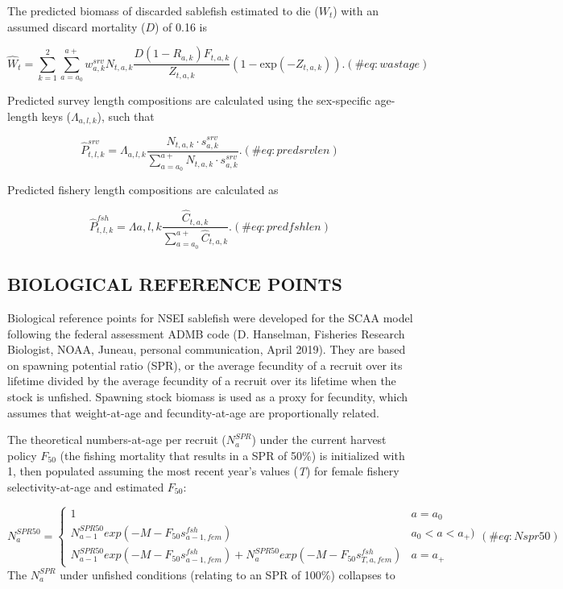 \documentclass[
]{article}
\begin{document}
The predicted biomass of discarded sablefish estimated to die (\(W_t\))
with an assumed discard mortality (\(D\)) of 0.16 is

\[
\begin{equation}
\hat{W}_t= \sum_{k=1}^{2}\sum_{a=a_0}^{a+}w_{a,k}^{srv}N_{t,a,k}\frac{D (1-R_{a,k})F_{t,a,k}}{Z_{t,a,k}}(1-\mbox{exp}(-Z_{t,a,k})).
(\#eq:wastage)
\end{equation}
\]

Predicted survey length compositions are calculated using the
sex-specific age-length keys (\(\Lambda_{a,l,k}\)), such that

\[
\begin{equation}
\hat{P}_{t,l,k}^{srv}=\Lambda_{a,l,k}\frac{N_{t,a,k} \cdot s_{a,k}^{srv}}{\sum_{a=a_0}^{a+} N_{t,a,k} \cdot s_{a,k}^{srv}}.
(\#eq:predsrvlen)
\end{equation}
\]

Predicted fishery length compositions are calculated as

\[
\begin{equation}
\hat{P}_{t,l,k}^{fsh}=\Lambda{a,l,k}\frac{\hat{C}_{t,a,k}}{\sum_{a=a_0}^{a+} \hat{C}_{t,a,k}}.
(\#eq:predfshlen)
\end{equation}
\]

\hypertarget{biological-reference-points}{%
\subsection{BIOLOGICAL REFERENCE
POINTS}\label{biological-reference-points}}

Biological reference points for NSEI sablefish were developed for the
SCAA model following the federal assessment ADMB code (D. Hanselman,
Fisheries Research Biologist, NOAA, Juneau, personal communication,
April 2019). They are based on spawning potential ratio (SPR), or the
average fecundity of a recruit over its lifetime divided by the average
fecundity of a recruit over its lifetime when the stock is unfished.
Spawning stock biomass is used as a proxy for fecundity, which assumes
that weight-at-age and fecundity-at-age are proportionally related.

The theoretical numbers-at-age per recruit (\(N_a^{SPR}\)) under the
current harvest policy \(F_{50}\) (the fishing mortality that results in
a SPR of 50\%) is initialized with 1, then populated assuming the most
recent year's values (\emph{T}) for female fishery selectivity-at-age
and estimated \(F_{50}\):

\[
\begin{equation}
N_{a}^{SPR50} = \left\{ \begin{array}{lll}
1 &a = a_{0}\\
N_{a-1}^{SPR50}exp(-M-F_{50}s^{fsh}_{a-1,fem}) &a_{0} < a < a_{+})\\
N_{a-1}^{SPR50}exp(-M-F_{50}s^{fsh}_{a-1,fem}) +  N_{a}^{SPR50}exp(-M-F_{50}s^{fsh}_{T,a,fem}) &a=a_{+}
\end{array}\right.
(\#eq:Nspr50)
\end{equation}
\] The \(N_a^{SPR}\) under unfished conditions (relating to an SPR of
100\%) collapses to
\end{document}
